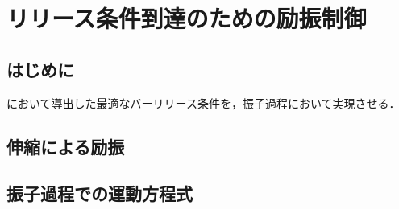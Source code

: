 \chapter[リリース条件到達のための励振制御]%
{リリース条件到達のための励振制御}
        \section{はじめに}

          において導出した最適なバーリリース条件を，振子過程において実現させる．


        \section{伸縮による励振}
        \section{振子過程での運動方程式}
